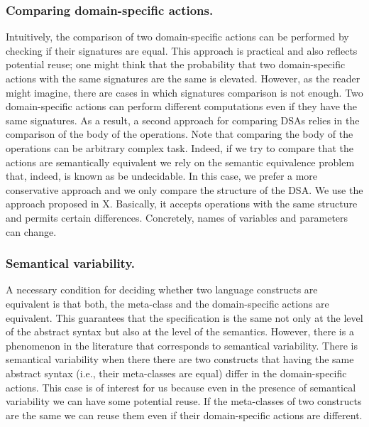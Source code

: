 \subsubsection{Comparing domain-specific actions.} Intuitively, the comparison of two domain-specific actions can be performed by checking if their signatures are equal. This approach is practical and also reflects potential reuse; one might think that the probability that two domain-specific actions with the same signatures are the same is elevated. However, as the reader might imagine, there are cases in which signatures comparison is not enough. Two domain-specific actions can perform different computations even if they have the same signatures. As a result, a second approach for comparing DSAs relies in the comparison of the body of the operations. Note that comparing the body of the operations can be arbitrary complex task. Indeed, if we try to compare that the actions are semantically equivalent we rely on the semantic equivalence problem that, indeed, is known as be undecidable. In this case, we prefer a more conservative approach and we only compare the structure of the DSA. We use the approach proposed in X. Basically, it accepts operations with the same structure and permits certain differences. Concretely, names of variables and parameters can change.

\vspace{-2mm}
\subsubsection{Semantical variability.} A necessary condition for deciding whether two language constructs are equivalent is that both, the meta-class and the domain-specific actions are equivalent. This guarantees that the specification is the same not only at the level of the abstract syntax but also at the level of the semantics. However, there is a phenomenon in the literature that corresponds to semantical variability. There is semantical variability when there there are two constructs that having the same abstract syntax (i.e., their meta-classes are equal) differ in the domain-specific actions. This case is of interest for us because even in the presence of semantical variability we can have some potential reuse. If the meta-classes of two constructs are the same we can reuse them even if their domain-specific actions are different. 
